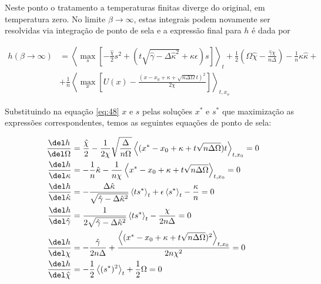 Neste ponto o tratamento a temperaturas finitas diverge do original,
em temperatura zero. No limite $\beta \to \infty$, estas integrais
podem novamente ser resolvidas via integração de ponto de sela e a
expressão final para $h$ é dada por

\begin{align}
  \label{eq:48}
  h(\beta \to \infty)& = \left\langle \max_s \left[-\frac{\hat{\chi}}{2}s^2 + (t \sqrt{\hat{\gamma} - \Delta
      \hat{\kappa}^2} + \hat{\kappa}\epsilon) s\right] \right\rangle_t +
  \frac{1}{2} \left(\Omega \hat{\chi} - \frac{\hat{\gamma}
      \chi}{n\Delta}\right) - \frac{1}{n} \kappa \hat{\kappa} + \nonumber\\ &+
  \frac{1}{n} \left\langle \max_x \left[U(x) - \frac{(x - x_0 + \kappa +
      \sqrt{n\Delta\Omega}t)^2}{2\chi}\right] \right\rangle_{t,x_o}
\end{align}

Substituindo na equação \eqref{eq:48} $x$ e $s$ pelas soluções $x^*$ e
$s^*$ que maximização as expressões correspondentes, temos as
seguintes equações de ponto de sela:

\begin{align}
  \frac{\del h}{\del \Omega} & = \frac{\hat{\chi}}{2} -
  \frac{1}{2\chi} \sqrt{\frac{\Delta}{n\Omega}}\left\langle (x^* - x_0
  + \kappa + t \sqrt{n\Delta\Omega})t\right \rangle_{t,x_0} = 0   \label{eq:omega}\\
  \frac{\del h}{\del \kappa} & = -\frac{1}{n}\hat{\kappa} -
  \frac{1}{n\chi}\left\langle x^* - x_0 + \kappa +
    t\sqrt{n\Delta\Omega} \right \rangle_{t,x_0} = 0  \label{eq:kappa} \\
  \frac{\del h}{\del \hat{\kappa}} & = -\frac{\Delta\hat{\kappa}}{\sqrt{\hat{\gamma} - \Delta
      \hat{\kappa}^2}} \left\langle t s^*\right\rangle_t + \epsilon
  \left\langle s^*\right\rangle_t - \frac{\kappa}{n} = 0 \label{eq:hatkappa}\\
  \frac{\del h}{\del \hat{\gamma}} & = \frac{1}{2\sqrt{\hat{\gamma} - \Delta
      \hat{\kappa}^2}} \left\langle t s^*\right\rangle_t -
  \frac{\chi}{2n\Delta} = 0\label{eq:gamma}\\
  \frac{\del h}{\del \chi} & = - \frac{\hat{\gamma}}{2n\Delta} + \frac{\left\langle (x^* - x_0 + \kappa +
    t\sqrt{n\Delta\Omega})^2 \right \rangle_{t,x_0}}{2n\chi^2} = 0\label{eq:chi}\\
  \frac{\del h}{\del \hat{\chi}} & = -\frac{1}{2} \left\langle (s^*)^2
  \right\rangle_t + \frac{1}{2} \Omega = 0\label{eq:hatchi}
\end{align}

